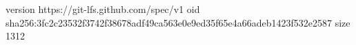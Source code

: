 version https://git-lfs.github.com/spec/v1
oid sha256:3fc2c23532f3742f38678adf49ca563e0e9ed35f65e4a66adeb1423f532e2587
size 1312
